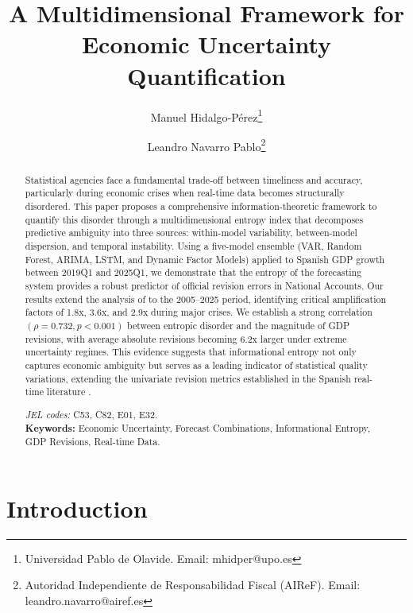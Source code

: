 \documentclass[12pt,a4paper]{article}
\theoremstyle{remark}
\begin{document}
\title{A Multidimensional Framework for Economic Uncertainty Quantification}
\author{Manuel Hidalgo-Pérez\thanks{Universidad Pablo de Olavide. Email: mhidper@upo.es} \and Leandro Navarro Pablo\thanks{Autoridad Independiente de Responsabilidad Fiscal (AIReF). Email: leandro.navarro@airef.es}}
\date{}

\maketitle

\begin{abstract}
Statistical agencies face a fundamental trade-off between timeliness and accuracy, particularly during economic crises when real-time data becomes structurally disordered. This paper proposes a comprehensive information-theoretic framework to quantify this disorder through a multidimensional entropy index that decomposes predictive ambiguity into three sources: within-model variability, between-model dispersion, and temporal instability. Using a five-model ensemble (VAR, Random Forest, ARIMA, LSTM, and Dynamic Factor Models) applied to Spanish GDP growth between 2019Q1 and 2025Q1, we demonstrate that the entropy of the forecasting system provides a robust predictor of official revision errors in National Accounts. Our results extend the analysis of \cite{pavia2018} to the 2005--2025 period, identifying critical amplification factors of 1.8x, 3.6x, and 2.9x during major crises. We establish a strong correlation $(\rho = 0.732, p < 0.001)$ between entropic disorder and the magnitude of GDP revisions, with average absolute revisions becoming 6.2x larger under extreme uncertainty regimes. This evidence suggests that informational entropy not only captures economic ambiguity but serves as a leading indicator of statistical quality variations, extending the univariate revision metrics established in the Spanish real-time literature \citep{pavia2018}.

\vspace{0.5cm}
\noindent\textit{JEL codes:} C53, C82, E01, E32.\\
\textbf{Keywords:} Economic Uncertainty, Forecast Combinations, Informational Entropy, GDP Revisions, Real-time Data.
\end{abstract}

\section{Introduction}
\end{document}
